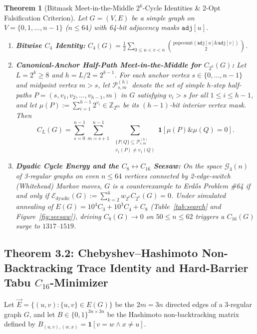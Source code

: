 \documentclass[10pt,a4paper]{article}
\newtheorem{theorem}{Theorem}[section]
\theoremstyle{definition}
\theoremstyle{remark}
\begin{document}
\begin{theorem}[Bitmask Meet-in-the-Middle $2^k$-Cycle Identities \& 2-Opt Falsification Criterion]\label{thm:mitm}
Let $G = (V, E)$ be a simple graph on $V = \{0, 1, \dots, n-1\}$ ($n \le 64$) with 64-bit adjacency masks $\mathtt{adj}[u]$.
\begin{enumerate}[label=(\alph*),nosep]
  \item \textbf{Bitwise $C_4$ Identity:} $C_4(G) = \frac{1}{2} \sum_{0 \le u < v < n} \binom{\mathrm{popcount}(\mathtt{adj}[u] \mathbin{\&} \mathtt{adj}[v])}{2}$.
  \item \textbf{Canonical-Anchor Half-Path Meet-in-the-Middle for $C_{2^k}(G)$:} Let $L = 2^k \ge 8$ and $h = L/2 = 2^{k-1}$. For each anchor vertex $s \in \{0, \dots, n-1\}$ and midpoint vertex $m > s$, let $\mathcal{P}_{s,m}^{(h)}$ denote the set of simple $h$-step half-paths $P = (s, v_1, v_2, \dots, v_{h-1}, m)$ in $G$ satisfying $v_i > s$ for all $1 \le i \le h-1$, and let $\mu(P) := \sum_{i=1}^{h-1} 2^{v_i} \in \mathbb{Z}_{2^{64}}$ be its $(h-1)$-bit interior vertex mask. Then
  \begin{equation}\label{eq:mitm}
    C_L(G) = \sum_{s=0}^{n-1} \sum_{m=s+1}^{n-1} \;\sum_{\substack{\{P, Q\} \subseteq \mathcal{P}_{s,m}^{(h)} \\ v_1(P) \ne v_1(Q)}} \mathbf{1}\!\left[\mu(P) \mathbin{\&} \mu(Q) = 0\right].
  \end{equation}
  \item \textbf{Dyadic Cycle Energy and the $C_8 \leftrightarrow C_{16}$ Seesaw:} On the space $\mathcal{G}_3(n)$ of 3-regular graphs on even $n \le 64$ vertices connected by 2-edge-switch (Whitehead) Markov moves, $G$ is a counterexample to Erd\H{o}s Problem \#64 if and only if $\mathcal{E}_{\mathrm{dyadic}}(G) := \sum_{k=2}^{6} w_{2^k} C_{2^k}(G) = 0$. Under simulated annealing of $E(G) = 10^4 C_3 + 10^3 C_4 + C_8$ (Table~\ref{tab:search} and Figure~\ref{fig:seesaw}), driving $C_8(G) \to 0$ on $50 \le n \le 62$ triggers a $C_{16}(G)$ surge to $1317$--$1519$.
\end{enumerate}
\end{theorem}

\subsection{Theorem 3.2: Chebyshev--Hashimoto Non-Backtracking Trace Identity and Hard-Barrier Tabu $C_{16}$-Minimizer}

Let $\vec{E} = \{(u, v) : \{u, v\} \in E(G)\}$ be the $2m = 3n$ directed edges of a 3-regular graph $G$, and let $B \in \{0, 1\}^{3n \times 3n}$ be the Hashimoto non-backtracking matrix \cite{hashimoto1989zeta} defined by $B_{(u,v),(w,x)} = \mathbf{1}[v = w \wedge x \ne u]$.
\end{document}
